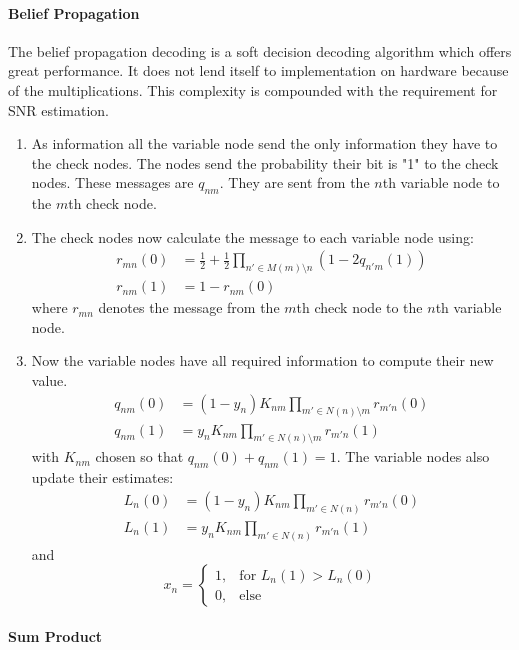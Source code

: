 \paragraph{Belief Propagation}
The belief propagation decoding is a soft decision decoding algorithm which offers great performance\cite{KoYu01}. It does not lend itself to implementation on hardware because of the multiplications. This complexity is compounded with the requirement for SNR estimation.
\begin{enumerate}
	\item As information all the variable node send the only information they have to the check nodes. The nodes send the probability their bit is "1" to the check nodes. These messages are $q_{nm}$. They are sent from the $n$th variable node to the $m$th check node.
	\item The check nodes now calculate the message to each variable node using:
		\begin{align*}
			r_{mn}(0) & = \frac{1}{2} + \frac{1}{2} \prod_{n' \in M(m) \setminus n}\left(1 - 2 q_{n'm}(1)\right) \\
			r_{nm}(1) & = 1 - r_{nm}(0)
		\end{align*}
		where $r_{mn}$ denotes the message from the $m$th check node to the $n$th variable node.
	\item Now the variable nodes have all required information to compute their new value.
		\begin{align*}
			q_{nm}(0) & = (1 - y_n) K_{nm} \prod_{m' \in N(n) \setminus m}r_{m'n}(0) \\
			q_{nm}(1) & = y_n K_{nm} \prod_{m' \in N(n) \setminus m}r_{m'n}(1)
		\end{align*}
		with $K_{nm}$ chosen so that $q_{nm}(0) + q_{nm}(1) = 1$. The variable nodes also update their estimates:
		\begin{align*}
			L_n(0) & = (1 - y_n) K_{nm} \prod_{m' \in N(n)}r_{m'n}(0) \\
			L_n(1) & = y_n K_{nm} \prod_{m' \in N(n)}r_{m'n}(1)
		\end{align*}
		and
		\begin{equation*}
			x_n = \begin{cases}
				1, & \text{for } L_n(1) > L_n(0) \\
				0, & \text{else}
			\end{cases}
		\end{equation*}
\end{enumerate}

\paragraph{Sum Product}

